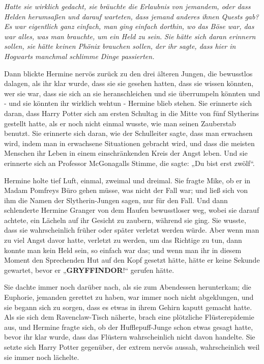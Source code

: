 {\emph{Hatte sie wirklich gedacht, sie bräuchte die Erlaubnis von jemandem, oder dass Helden herumsaßen und darauf warteten, dass jemand anderes ihnen Quests gab? Es war eigentlich ganz einfach, man ging einfach dorthin, wo das Böse war, das war alles, was man brauchte, um ein Held zu sein.} \emph{Sie hätte sich daran erinnern sollen, sie hätte keinen Phönix brauchen sollen, der ihr sagte, dass hier in Hogwarts manchmal schlimme Dinge passierten.}

Dann blickte Hermine nervös zurück zu den drei älteren Jungen, die bewusstlos dalagen, als ihr klar wurde, dass sie sie gesehen hatten, dass sie wissen könnten, wer sie war, dass sie sich an sie heranschleichen und sie überrumpeln könnten und - und sie könnten ihr wirklich wehtun - Hermine blieb stehen. Sie erinnerte sich daran, dass Harry Potter sich am ersten Schultag in die Mitte von fünf Slytherins gestellt hatte, als er noch nicht einmal wusste, wie man seinen Zauberstab benutzt. Sie erinnerte sich daran, wie der Schulleiter sagte, dass man erwachsen wird, indem man in erwachsene Situationen gebracht wird, und dass die meisten Menschen ihr Leben in einem einschränkenden Kreis der Angst leben. Und sie erinnerte sich an Professor McGonagalls Stimme, die sagte: „Du bist erst zwölf“.

Hermine holte tief Luft, einmal, zweimal und dreimal. Sie fragte Mike, ob er in Madam Pomfreys Büro gehen müsse, was nicht der Fall war; und ließ sich von ihm die Namen der Slytherin-Jungen sagen, nur für den Fall. Und dann schlenderte Hermine Granger von dem Haufen bewusstloser weg, wobei sie darauf achtete, ein Lächeln auf ihr Gesicht zu zaubern, während sie ging. Sie wusste, dass sie wahrscheinlich früher oder später verletzt werden würde. Aber wenn man zu viel Angst davor hatte, verletzt zu werden, um das Richtige zu tun, dann konnte man kein Held sein, so einfach war das; und wenn man ihr in diesem Moment den Sprechenden Hut auf den Kopf gesetzt hätte, hätte er keine Sekunde gewartet, bevor er „\textbf{GRYFFINDOR}!“ gerufen hätte.

Sie dachte immer noch darüber nach, als sie zum Abendessen herunterkam; die Euphorie, jemanden gerettet zu haben, war immer noch nicht abgeklungen, und sie begann sich zu sorgen, dass es etwas in ihrem Gehirn kaputt gemacht hatte. Als sie sich dem Ravenclaw-Tisch näherte, brach eine plötzliche Flüsterepidemie aus, und Hermine fragte sich, ob der Hufflepuff-Junge schon etwas gesagt hatte, bevor ihr klar wurde, dass das Flüstern wahrscheinlich nicht davon handelte. Sie setzte sich Harry Potter gegenüber, der extrem nervös aussah, wahrscheinlich weil sie immer noch lächelte.

}
